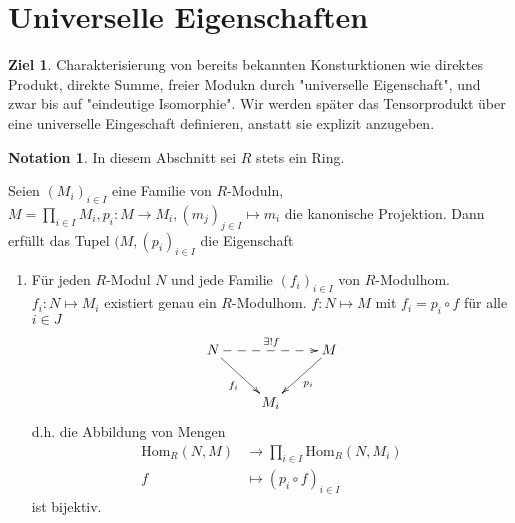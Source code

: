 \documentclass[a4paper, titlepage]{article}
\theoremstyle{definition}
\newtheorem*{ziel}{Ziel}
\newtheorem*{notation}{Notation}
\newcommand{\Hom}{\mathrm{Hom}}
\begin{document}
        \part{Universelle Eigenschaften}
        \begin{ziel}
            Charakterisierung von bereits bekannten Konsturktionen wie direktes Produkt, direkte Summe, freier Modukn durch "universelle Eigenschaft", und zwar bis auf "eindeutige Isomorphie". Wir werden später das Tensorprodukt über eine universelle Eingeschaft definieren, anstatt sie explizit anzugeben.
        \end{ziel}
        \begin{notation}
            In diesem Abschnitt sei $R$ stets ein Ring.
        \end{notation}
        \begin{satz}
            Seien $(M_i)_{i\in I}$ eine Familie von $R$-Moduln, $M=\prod\limits_{i\in I}M_i, p_i:M\longrightarrow M_i, (m_j)_{j\in I}\longmapsto m_i$ die kanonische Projektion. Dann erfüllt das Tupel $(M,(p_i)_{i\in I}$ die Eigenschaft
         \begin{enumerate}[(UP)]
                \item Für jeden $R$-Modul $N$ und jede Familie $(f_i)_{i\in I}$ von $R$-Modulhom. $f_i:N\mapsto M_i$ existiert genau ein $R$-Modulhom. $f:N\mapsto M $ mit $f_i=p_i\circ f$ für alle $i\in J$
                \[ 
                \begin{xy}
                    \xymatrix{
                    N \ar@{-->}[rr]^{\exists!f} \ar[dr]_{f_i} &&M\ar[dl]^{p_i}\\
                    &M_i&
                    }
                \end{xy}
                \]
                d.h. die Abbildung von Mengen 
                \begin{align*}
                    \Hom_R(N,M)&\longrightarrow \prod_{i\in I}\Hom_R(N,M_i)\\
                    f&\longmapsto (p_i\circ f)_{i\in I}
                \end{align*}
                ist bijektiv.
            \end{enumerate}
        \end{satz}
\end{document}
